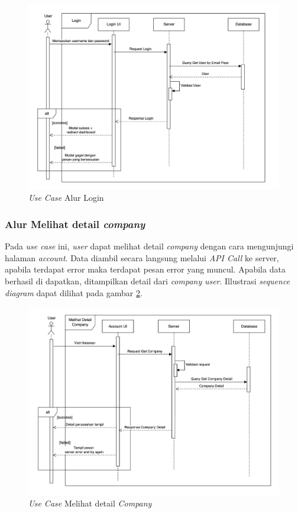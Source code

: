 \begin{figure}[ht]
  \centering
  \includegraphics[width=1\textwidth]{resources/chapter-3/usecase/uc-05.jpg}
  \caption{\textit{Use Case} Alur Login}
  \label{fig:usecase-05}
\end{figure}

\subsubsection{Alur Melihat detail \textit{company}}

Pada \textit{use case} ini, \textit{user} dapat melihat detail \textit{company} dengan cara mengunjungi halaman \textit{account}. Data diambil secara langsung melalui \textit{API Call} ke server, apabila terdapat error maka terdapat pesan error yang muncul. Apabila data berhasil di dapatkan, ditampilkan detail dari \textit{company} \textit{user}. Illustrasi \textit{sequence diagram} dapat dilihat pada gambar \ref{fig:usecase-06}.

\begin{figure}[ht]
  \centering
  \includegraphics[width=1\textwidth]{resources/chapter-3/usecase/uc-06.jpg}
  \caption{\textit{Use Case} Melihat detail \textit{Company}}
  \label{fig:usecase-06}
\end{figure}

